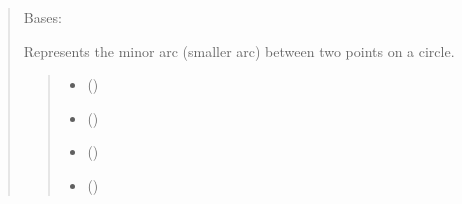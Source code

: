 \documentclass[letterpaper,10pt,english]{sphinxmanual}
\begin{document}
\begin{quote}
\begin{fulllineitems}
\begin{fulllineitems}
\begin{quote}
\begin{description}
\sphinxAtStartPar
{}

\end{description}\end{quote}

\end{fulllineitems}


\end{fulllineitems}


\begin{fulllineitems}
\label{\detokenize{pygeox:pygeox.basic_objects.MinorArc}}
\pysigstartsignatures
\pysiglinewithargsret
{}
{\sphinxparamcomma {}\sphinxparamcomma {}\sphinxparamcomma {}}
{}
\pysigstopsignatures
\sphinxAtStartPar
Bases: 

\sphinxAtStartPar
Represents the minor arc (smaller arc) between two points on a circle.
\begin{quote}\begin{description}
\begin{itemize}
\item {} 
\sphinxAtStartPar
{} ()

\item {} 
\sphinxAtStartPar
{} ()

\item {} 
\sphinxAtStartPar
{} ()

\item {} 
\sphinxAtStartPar
{} (\sphinxstyleliteralemphasis{\sphinxupquote{ | }})

\end{itemize}


\end{description}
\end{quote}
\end{fulllineitems}
\end{quote}
\end{document}

